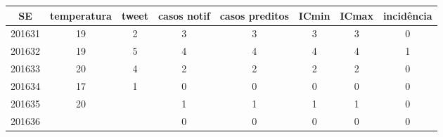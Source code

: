 \begin{tabular}{c|ccccccc}
  \hline
SE & temperatura & tweet & casos notif & casos preditos & ICmin & ICmax & incidência \\ 
  \hline
201631 & 19 & 2 & 3 & 3 & 3 & 3 & 0 \\ 
  201632 & 19 & 5 & 4 & 4 & 4 & 4 & 1 \\ 
  201633 & 20 & 4 & 2 & 2 & 2 & 2 & 0 \\ 
  201634 & 17 & 1 & 0 & 0 & 0 & 0 & 0 \\ 
  201635 & 20 &  & 1 & 1 & 1 & 1 & 0 \\ 
  201636 &  &  & 0 & 0 & 0 & 0 & 0 \\ 
   \hline
\end{tabular}
